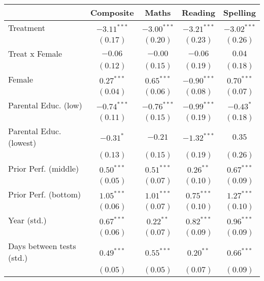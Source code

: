 
\begin{table}
\begin{center}
\begin{tabular}{l c c c c}
\hline
 & Composite & Maths & Reading & Spelling \\
\hline
Treatment                 & $-3.11^{***}$ & $-3.00^{***}$ & $-3.21^{***}$ & $-3.02^{***}$ \\
                          & $(0.17)$      & $(0.20)$      & $(0.23)$      & $(0.26)$      \\
Treat x Female            & $-0.06$       & $-0.00$       & $-0.06$       & $0.04$        \\
                          & $(0.12)$      & $(0.15)$      & $(0.19)$      & $(0.18)$      \\
Female                    & $0.27^{***}$  & $0.65^{***}$  & $-0.90^{***}$ & $0.70^{***}$  \\
                          & $(0.04)$      & $(0.06)$      & $(0.08)$      & $(0.07)$      \\
Parental Educ. (low)      & $-0.74^{***}$ & $-0.76^{***}$ & $-0.99^{***}$ & $-0.43^{*}$   \\
                          & $(0.11)$      & $(0.15)$      & $(0.19)$      & $(0.18)$      \\
Parental Educ. (lowest)   & $-0.31^{*}$   & $-0.21$       & $-1.32^{***}$ & $0.35$        \\
                          & $(0.13)$      & $(0.15)$      & $(0.19)$      & $(0.26)$      \\
Prior Perf. (middle)      & $0.50^{***}$  & $0.51^{***}$  & $0.26^{**}$   & $0.67^{***}$  \\
                          & $(0.05)$      & $(0.07)$      & $(0.10)$      & $(0.09)$      \\
Prior Perf. (bottom)      & $1.05^{***}$  & $1.01^{***}$  & $0.75^{***}$  & $1.27^{***}$  \\
                          & $(0.06)$      & $(0.07)$      & $(0.10)$      & $(0.10)$      \\
Year (std.)               & $0.67^{***}$  & $0.22^{**}$   & $0.82^{***}$  & $0.96^{***}$  \\
                          & $(0.06)$      & $(0.07)$      & $(0.09)$      & $(0.09)$      \\
Days between tests (std.) & $0.49^{***}$  & $0.55^{***}$  & $0.20^{**}$   & $0.66^{***}$  \\
                          & $(0.05)$      & $(0.05)$      & $(0.07)$      & $(0.09)$      \\

\end{tabular}
\end{center}
\end{table}
